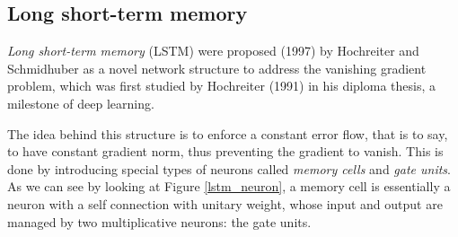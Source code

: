
\subsection{Long short-term memory} 

\textit{Long short-term memory} (LSTM) were proposed (1997) by Hochreiter and Schmidhuber\cite{lstm} as a novel network 
structure to address the vanishing gradient problem, which was first studied by Hochreiter (1991) in his diploma 
thesis, a milestone of deep learning.

The idea behind this structure is to enforce a constant error flow, that is to say, to have constant gradient norm, 
thus preventing the gradient to vanish. This is done by introducing special types of neurons called \textit{memory 
cells} and \textit{gate units}. As we can see by looking at Figure \ref{lstm_neuron}, a memory cell is essentially a 
neuron with a self connection with unitary weight, whose input and output are managed by two multiplicative neurons: 
the gate units.


